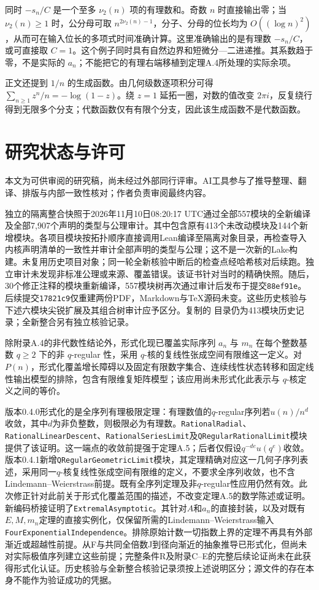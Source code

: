 \documentclass[UTF8,11pt,fontset=fandol]{ctexart}
\begin{document}
同时 $-s_n/C$ 是一个至多 $\nu_2(n)$ 项的有理数和。奇数 $n$ 时直接输出零；当 $\nu_2(n)\ge1$ 时，公分母可取 $n^{2\nu_2(n)-1}$，分子、分母的位长均为 $O((\log n)^2)$，从而可在输入位长的多项式时间准确计算。这里准确输出的是有理数 $-s_n/C$，或可直接取 $C=1$。这个例子同时具有自然边界和短微分—二进递推。其系数趋于零，不是实际的 $a_n$；不能把它的有理右端移植到定理A.4所处理的实际余项。

正文还提到 $1/n$ 的生成函数。由几何级数逐项积分可得 $\sum_{n\ge1}z^n/n=-\log(1-z)$。绕 $z=1$ 延拓一圈，对数的值改变 $2\pi i$，反复绕行得到无限多个分支；代数函数仅有有限个分支，因此该生成函数不是代数函数。

\section*{研究状态与许可}
本文为可供审阅的研究稿，尚未经过外部同行评审。AI工具参与了推导整理、翻译、排版与内部一致性核对；作者负责审阅最终内容。

独立的隔离整合快照于2026年11月10日08:20:17 UTC通过全部557模块的全新编译及全部7,907个声明的类型与公理审计。其中包含原有413个未改动模块及144个新增模块。各项目模块按拓扑顺序直接调用Lean编译至隔离对象目录，再检查导入内核声明清单的一致性并审计全部声明的类型与公理；这不是一次新的Lake构建。未复用历史项目对象；同一轮全新核验中断后的检查点经哈希核对后续跑。独立审计未发现非标准公理或来源、覆盖错误。该证书针对当时的精确快照。随后，30个修正注释的模块重新编译，557模块树再次通过审计后发布于提交\texttt{88ef91e}。后续提交\texttt{17821c9}仅重建两份PDF，Markdown与TeX源码未变。这些历史核验与下述六模块尖锐扩展及其组合树审计应予区分。复制的  目录仍为413模块历史记录；全新整合另有独立核验记录。

除附录A.4的非代数性结论外，形式化现已覆盖实际序列 $a_n$ 与 $m_n$ 在每个整数基数 $q\ge2$ 下的非 $q$-regular 性，采用 $q$-核的复线性张成空间有限维这一定义。对 $P(n)$，形式化覆盖增长障碍以及固定有限数字集合、连续线性状态转移和固定线性输出模型的排除，包含有限维复矩阵模型；该应用尚未形式化此表示与 $q$-核定义之间的等价。

版本0.4.0形式化的是全序列有理极限定理：有理数值的$q$-regular序列若$u(n)/n^d$收敛，其中$d$为非负整数，则极限必为有理数。\texttt{RationalRadial}、\texttt{RationalLinearDescent}、\texttt{RationalSeriesLimit}及\texttt{QRegularRationalLimit}模块提供了该证明。这一端点的收敛前提强于定理A.5；后者仅假设$q^{-de}u(q^e)$收敛。版本0.4.1新增\texttt{QRegularGeometricLimit}模块，其定理精确对应这一几何子序列表述，采用同一$q$-核复线性张成空间有限维的定义，不要求全序列收敛，也不含Lindemann--Weierstrass前提。既有全序列定理及非$q$-regular性应用仍然有效。此次修正针对此前关于形式化覆盖范围的描述，不改变定理A.5的数学陈述或证明。新编码桥接证明了\texttt{ExtremalAsymptotic}。其针对$A$和$a_n$的直接封装，以及对既有$E,M,m_n$定理的直接实例化，仅保留所需的Lindemann--Weierstrass输入\texttt{FourExponentialIndependence}。排除原始计数一切指数上界的定理不再具有外部渐近或超越性前提。从F与共同全倍数J到径向渐近的抽象推导已形式化，但尚未对实际极值序列建立这些前提；完整条件R及附录C--E的完整后续论证尚未在此获得形式化认证。历史核验与全新整合核验记录须按上述说明区分；源文件的存在本身不能作为验证成功的凭据。
\end{document}
